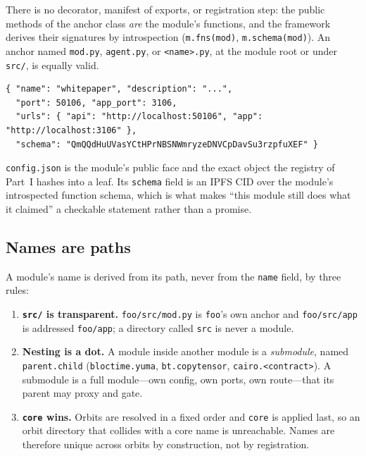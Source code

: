 \documentclass[11pt,a4paper]{article}
\begin{document}
There is no decorator, manifest of exports, or registration step: the public
methods of the anchor class \emph{are} the module's functions, and the
framework derives their signatures by introspection
(\texttt{m.fns(mod)}, \texttt{m.schema(mod)}). An anchor named \texttt{mod.py},
\texttt{agent.py}, or \texttt{<name>.py}, at the module root or under
\texttt{src/}, is equally valid.

\begin{lstlisting}[style=python]
{ "name": "whitepaper", "description": "...",
  "port": 50106, "app_port": 3106,
  "urls": { "api": "http://localhost:50106", "app": "http://localhost:3106" },
  "schema": "QmQQdHuUVasYCtHPrNBSNWmryzeDNVCpDavSu3rzpfuXEF" }
\end{lstlisting}

\texttt{config.json} is the module's public face and the exact object the
registry of Part~I hashes into a leaf. Its \texttt{schema} field is an IPFS CID
over the module's introspected function schema, which is what makes ``this
module still does what it claimed'' a checkable statement rather than a promise.

\subsection{Names are paths}

A module's name is derived from its path, never from the \texttt{name} field,
by three rules:

\begin{enumerate}
    \item \textbf{\texttt{src/} is transparent.} \texttt{foo/src/mod.py} is
    \texttt{foo}'s own anchor and \texttt{foo/src/app} is addressed
    \texttt{foo/app}; a directory called \texttt{src} is never a module.
    \item \textbf{Nesting is a dot.} A module inside another module is a
    \emph{submodule}, named \texttt{parent.child}
    (\texttt{bloctime.yuma}, \texttt{bt.copytensor}, \texttt{cairo.<contract>}).
    A submodule is a full module---own config, own ports, own route---that its
    parent may proxy and gate.
    \item \textbf{\texttt{core} wins.} Orbits are resolved in a fixed order and
    \texttt{core} is applied last, so an orbit directory that collides with a
    core name is unreachable. Names are therefore unique across orbits by
    construction, not by registration.
\end{enumerate}
\end{document}
